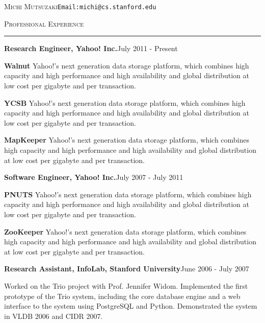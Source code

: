 \documentclass[10pt]{article}
\newcommand{\name}[1]{\begin{center}\Large{\textsc{#1}}\end{center}}
\newcommand{\HRule}{\noindent\rule{\linewidth}{0.1mm}}
\newcommand{\header}[1]{\vspace{0.4cm}\noindent\textsc{\large{#1}}\vspace{-0.2cm}\newline\HRule}
\newcommand{\subheader}[2]{\noindent \textbf{#1}\hspace{\stretch{1}}#2}
\renewcommand{\name}[2]{\noindent \textsc{\LARGE{#1}}\hspace{\stretch{1}}#2\vspace{-0.2cm}}
\begin{document}

\name{Michi Mutsuzaki}{\texttt{Email:michi@cs.stanford.edu}}


\header{Professional Experience}

\subheader{Research Engineer, Yahoo! Inc.}{July 2011 - Present}
\begin{list}{}{\leftmargin=1em}
\item \textbf{Walnut} Yahoo!'s next generation data storage platform,
which combines high capacity and high performance and high 
availability and global distribution at low cost per gigabyte and per transaction. 

\item \textbf{YCSB} Yahoo!'s next generation data storage platform,
which combines high capacity and high performance and high 
availability and global distribution at low cost per gigabyte and per transaction. 

\item \textbf{MapKeeper} Yahoo!'s next generation data storage platform,
which combines high capacity and high performance and high 
availability and global distribution at low cost per gigabyte and per transaction. 
\end{list}
\vspace{0.2cm}

\subheader{Software Engineer, Yahoo! Inc.}{July 2007 - July 2011}
\begin{list}{}{\leftmargin=1em}
\item \textbf{PNUTS} Yahoo!'s next generation data storage platform,
which combines high capacity and high performance and high 
availability and global distribution at low cost per gigabyte and per transaction. 
\item \textbf{ZooKeeper} Yahoo!'s next generation data storage platform,
which combines high capacity and high performance and high 
availability and global distribution at low cost per gigabyte and per transaction. 
\end{list}

\vspace{0.2cm}

\subheader{Research Assistant, InfoLab, Stanford University}{June 2006 - July 2007}

\noindent
\begin{list}{}{\leftmargin=1em}
\item Worked on the Trio project with Prof. Jennifer Widom. Implemented the
first prototype of the Trio system, including the core database engine and
a web interface to the system using PostgreSQL and Python. Demonstrated the
system in VLDB 2006 and CIDR 2007. 
\end{list}
\end{document}
